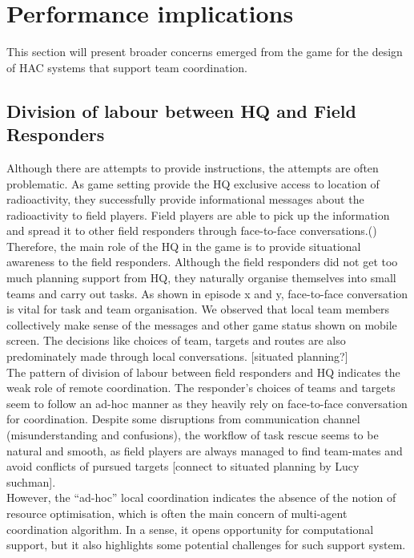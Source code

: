 \section{Performance implications}
This section will present broader concerns emerged from the game for the design of HAC systems that support team coordination.\\

\subsection{Division of labour between HQ and Field Responders}
Although there are attempts to provide instructions, the attempts are often problematic. As game setting provide the HQ exclusive access to location of radioactivity, they successfully provide informational messages about the radioactivity to field players. Field players are able to pick up the information and spread it to other field responders through face-to-face conversations.() Therefore, the main role of the HQ in the game is to provide situational awareness to the field responders. Although the field responders did not get too much planning support from HQ, they naturally organise themselves into small teams and carry out tasks. As shown in episode x and y,  face-to-face conversation is vital for task and team organisation. We observed that local team members collectively make sense of the messages and other game status shown on mobile screen. The decisions like choices of team, targets and routes are also predominately made through local conversations. [situated planning?]\\

The pattern of division of labour between field responders and HQ indicates the weak role of remote coordination. The responder's choices of teams and targets seem to follow an ad-hoc manner as they heavily rely on face-to-face conversation for coordination. Despite some disruptions from communication channel (misunderstanding and confusions), the workflow of task rescue seems to be natural and smooth, as field players are always managed to find team-mates and avoid conflicts of pursued targets [connect to situated planning by Lucy suchman]. \\

However, the ``ad-hoc'' local coordination indicates the absence of the notion of resource optimisation, which is often the main concern of multi-agent coordination algorithm. In a sense, it opens opportunity for computational support, but it also highlights some potential challenges for such support system. \\

